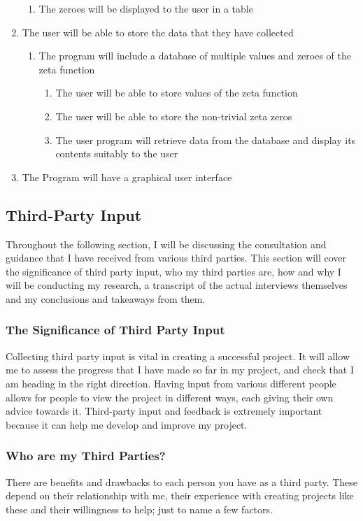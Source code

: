 \documentclass[12pt]{article}
\begin{document}
\begin{enumerate}
\begin{enumerate}
        \item The zeroes will be displayed to the user in a table
    \end{enumerate}
    \item The user will be able to store the data that they have collected
    \begin{enumerate}
        \item The program will include a database of multiple values and zeroes of the zeta function
        \begin{enumerate}
            \item The user will be able to store values of the zeta function
            \item The user will be able to store the non-trivial zeta zeros
            \item The user program will retrieve data from the database and display its contents suitably to the user
        \end{enumerate}
    \end{enumerate}
    \item The Program will have a graphical user interface
\end{enumerate}
\clearpage
\subsection{Third-Party Input}

Throughout the following section, I will be discussing the consultation and guidance that I have received from various third parties. This section will cover the significance of third party input, who my third parties are, how and why I will be conducting my research, a transcript of the actual interviews themselves and my conclusions and takeaways from them.

\subsubsection{The Significance of Third Party Input}
Collecting third party input is vital in creating a successful project. It will allow me to assess the progress that I have made so far in my project, and check that I am heading in the right direction. Having input from various different people allows for people to view the project in different ways, each giving their own advice towards it. Third-party input and feedback is extremely important because it can help me develop and improve my project.

\subsubsection{Who are my Third Parties?}
There are benefits and drawbacks to each person you have as a third party. These depend on their relationship with me, their experience with creating projects like these and their willingness to help; just to name a few factors.
\end{document}
